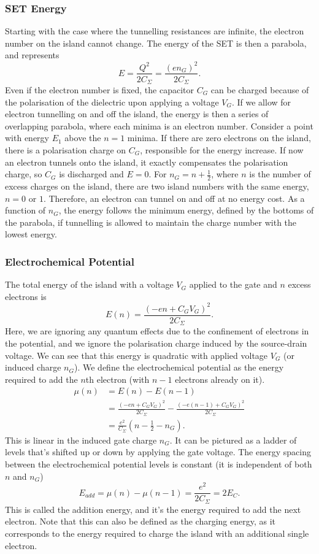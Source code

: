 \documentclass{article}
\begin{document}
\subsubsection{SET Energy}
Starting with the case where the tunnelling resistances are infinite, the electron number on the island cannot change. The energy of the SET is then a parabola, and represents 
\[
    E=\frac{Q^2}{2C_{\Sigma }}=\frac{\left( en_G \right)^2}{2C_{\Sigma }}.
\]
Even if the electron number is fixed, the capacitor $C_G$ can be charged because of the polarisation of the dielectric upon applying a voltage $V_G$. If we allow for electron tunnelling on and off the island, the energy is then a series of overlapping parabola, where each minima is an electron number. Consider a point with energy $E_1$ above the $n=1$ minima. If there are zero electrons on the island, there is a polarisation charge on $C_G$, responsible for the energy increase. If now an electron tunnels onto the island, it exactly compensates the polarisation charge, so $C_G$ is discharged and $E=0$. For $n_G=n+\frac{1}{2}$, where $n$ is the number of excess charges on the island, there are two island numbers with the same energy, $n=0$ or $1$. Therefore, an electron can tunnel on and off at no energy cost. As a function of $n_G$, the energy follows the minimum energy, defined by the bottoms of the parabola, if tunnelling is allowed to maintain the charge number with the lowest energy.

\subsubsection{Electrochemical Potential}
The total energy of the island with a voltage $V_G$ applied to the gate and $n$ excess electrons is 
\[
    E(n)=\frac{\left( -en+C_GV_G \right)^2}{2C_{\Sigma }}.
\]
Here, we are ignoring any quantum effects due to the confinement of electrons in the potential, and we ignore the polarisation charge induced by the source-drain voltage. We can see that this energy is quadratic with applied voltage $V_G$ (or induced charge $n_G$). We define the electrochemical potential as the energy required to add the $n$th electron (with $n-1$ electrons already on it).
\begin{align*}
    \mu (n) &= E(n)-E(n-1)\\
            &= \frac{\left( -en+C_GV_G \right)^2}{2C_{\Sigma }}-\frac{\left( -e(n-1) +C_GV_G\right)^2}{2C_{\Sigma }}\\
            &=\frac{e^2}{C_{\Sigma }}\left( n-\frac{1}{2}-n_G \right).
\end{align*}
This is linear in the induced gate charge $n_G$. It can be pictured as a ladder of levels that's shifted up or down by applying the gate voltage. The energy spacing between the electrochemical potential levels is constant (it is independent of both $n$ and $n_G$) 
\[
    E_{add}=\mu (n)-\mu (n-1)=\frac{e^2}{2C_{\Sigma }}=2E_C.
\]
This is called the addition energy, and it's the energy required to add the next electron. Note that this can also be defined as the charging energy, as it corresponds to the energy required to charge the island with an additional single electron.
\end{document}
